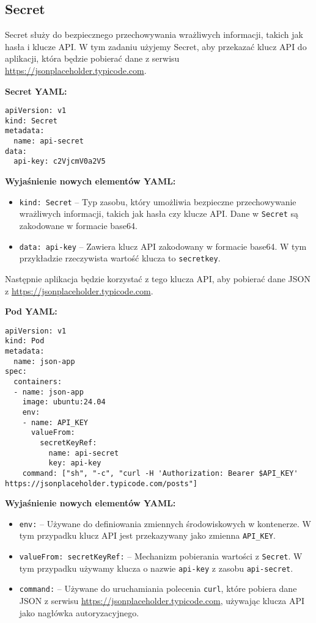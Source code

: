 \documentclass{article}
\begin{document}
\subsection{Secret}

Secret służy do bezpiecznego przechowywania wrażliwych informacji, takich jak hasła i klucze API. W tym zadaniu użyjemy Secret, aby przekazać klucz API do aplikacji, która będzie pobierać dane z serwisu \url{https://jsonplaceholder.typicode.com}.

\textbf{Secret YAML:}
\begin{lstlisting}
apiVersion: v1
kind: Secret
metadata:
  name: api-secret
data:
  api-key: c2VjcmV0a2V5
\end{lstlisting}

\textbf{Wyjaśnienie nowych elementów YAML:}
\begin{itemize}
  \item \texttt{kind: Secret} – Typ zasobu, który umożliwia bezpieczne przechowywanie wrażliwych informacji, takich jak hasła czy klucze API. Dane w \texttt{Secret} są zakodowane w formacie base64.
  \item \texttt{data: api-key} – Zawiera klucz API zakodowany w formacie base64. W tym przykładzie rzeczywista wartość klucza to \texttt{secretkey}.
\end{itemize}

Następnie aplikacja będzie korzystać z tego klucza API, aby pobierać dane JSON z \url{https://jsonplaceholder.typicode.com}.

\textbf{Pod YAML:}
\begin{lstlisting}
apiVersion: v1
kind: Pod
metadata:
  name: json-app
spec:
  containers:
  - name: json-app
    image: ubuntu:24.04
    env:
    - name: API_KEY
      valueFrom:
        secretKeyRef:
          name: api-secret
          key: api-key
    command: ["sh", "-c", "curl -H 'Authorization: Bearer $API_KEY' https://jsonplaceholder.typicode.com/posts"]
\end{lstlisting}

\textbf{Wyjaśnienie nowych elementów YAML:}
\begin{itemize}
  \item \texttt{env:} – Używane do definiowania zmiennych środowiskowych w kontenerze. W tym przypadku klucz API jest przekazywany jako zmienna \texttt{API\_KEY}.
  \item \texttt{valueFrom: secretKeyRef:} – Mechanizm pobierania wartości z \texttt{Secret}. W tym przypadku używamy klucza o nazwie \texttt{api-key} z zasobu \texttt{api-secret}.
  \item \texttt{command:} – Używane do uruchamiania polecenia \texttt{curl}, które pobiera dane JSON z serwisu \url{https://jsonplaceholder.typicode.com}, używając klucza API jako nagłówka autoryzacyjnego.
\end{itemize}
\end{document}
